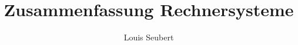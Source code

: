 \documentclass[a4paper,landscape]{article}
\title{Zusammenfassung Rechnersysteme}
\author{Louis Seubert}
\begin{document}
 \begin{multicols}{3}
  
   
  
  
  
  
  
  
  
  
 \end{multicols}
\end{document}
